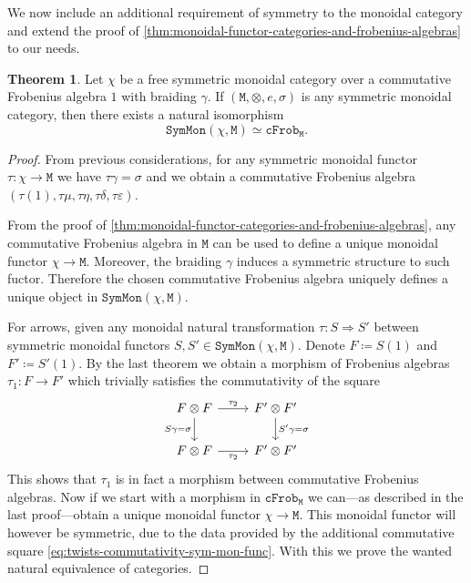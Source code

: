 \documentclass[11pt, reqno]{amsart}
\theoremstyle{definition}
\newtheorem{theorem}{Theorem}[section]
\newcommand{\iso}{\simeq}
\newcommand{\nat}{\Rightarrow}
\newcommand{\cat}{\texttt}
\newcommand{\catfont}{\texttt}
\newcommand{\cFrob}{{\catfont{cFrob}}} %
\newcommand{\SymMon}{{\catfont{SymMon}}} %
\begin{document}
We now include an additional requirement of symmetry to the monoidal
category and extend the proof of
\cref{thm:monoidal-functor-categories-and-frobenius-algebras} to our needs.

\begin{theorem}
\label{thm:sym-monoidal-functor-categories-and-frobenius-algebras}
Let \(\chi\) be a free symmetric monoidal category over a commutative Frobenius
algebra \(1\) with braiding \(\gamma\). If \((\cat M, \otimes, e, \sigma)\) is
any symmetric monoidal category, then there exists a natural isomorphism
\[
\SymMon(\chi, \cat M) \iso \cFrob_{\cat M}.
\]
\end{theorem}

\begin{proof}
From previous considerations, for any symmetric monoidal functor
\(\tau: \chi \to \cat M\) we have \(\tau \gamma = \sigma\) and we obtain a
commutative Frobenius algebra
\((\tau(1), \tau \mu, \tau \eta, \tau \delta, \tau \varepsilon)\).

From the proof of \cref{thm:monoidal-functor-categories-and-frobenius-algebras},
any commutative Frobenius algebra in \(\cat M\) can be used to define a unique
monoidal functor \(\chi \to \cat M\). Moreover, the braiding \(\gamma\) induces
a symmetric structure to such fuctor. Therefore the chosen commutative Frobenius
algebra uniquely defines a unique object in \(\SymMon(\chi, \cat M)\).

For arrows, given any monoidal natural transformation \(\tau: S \nat S'\)
between symmetric monoidal functors \(S, S' \in \SymMon(\chi, \cat M)\). Denote
\(F \coloneq S(1)\) and \(F' \coloneq S'(1)\). By the last theorem we obtain a
morphism of Frobenius algebras \(\tau_1: F \to F'\) which trivially satisfies the
commutativity of the square
\begin{equation}\label{eq:twists-commutativity-sym-mon-func}
\begin{tikzcd}
F \otimes F
\ar[d, "S \gamma = \sigma"']
\ar[r, "\tau_2"]
&F' \otimes F' \ar[d, "S' \gamma = \sigma"] \\
F \otimes F \ar[r, "\tau_2"']
&F' \otimes F'
\end{tikzcd}
\end{equation}
This shows that \(\tau_1\) is in fact a morphism between commutative Frobenius
algebras. Now if we start with a morphism in \(\cFrob_{\cat M}\) we can---as
described in the last proof---obtain a unique monoidal functor
\(\chi \to \cat M\). This monoidal functor will however be symmetric, due to the
data provided by the additional commutative square
\cref{eq:twists-commutativity-sym-mon-func}. With this we prove the wanted
natural equivalence of categories.
\end{proof}
\end{document}
